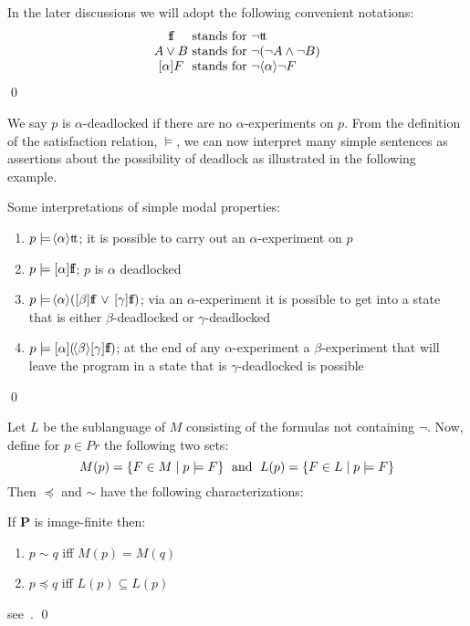 \begin{notation}
In the later discussions we will adopt the following convenient notations:
\[
\begin{array}{c@{\ \hbox{stands for}\ }l}
\dff & \neg \dtt\\
A\vee B & \neg (\neg A\wedge\neg B)\\
\may{\alpha}F & \neg\can{\alpha}\neg F
\end{array}
\]
\qed
\end{notation}

We say $p$ is $\alpha$-deadlocked if there are no $\alpha$-experiments on $p$. From the definition of the satisfaction relation, $\models$, we can now interpret many simple sentences as assertions about the possibility of deadlock as illustrated in the following example.

\begin{example}Some interpretations of simple modal properties:
\begin{enumerate}
\item $p\models \!\left<\alpha\right>\!\hbox{t}\!\hbox{t}$; it is possible to carry out an $\alpha$-experiment on $p$
\item $p\models[\alpha]\hbox{f}\!\hbox{f}$; $p$ is $\alpha$ deadlocked
\item $p\models\!\left<\alpha\right>\!([\beta]\hbox{f}\!\hbox{f}\,\vee\,[\gamma]\hbox{f}\!\hbox{f})$; via an $\alpha$-experiment it is possible to get into a state that is either $\beta$-deadlocked or $\gamma$-deadlocked
\item $p\models[\alpha](\!\left<\beta\right>\![\gamma]\hbox{f}\!\hbox{f})$; at the end of any $\alpha$-experiment a $\beta$-experiment that will leave the program in a state that is $\gamma$-deadlocked is possible
\end{enumerate}
\qed
\end{example}

Let $L$ be the sublanguage of $M$ consisting of the formulas not containing $\neg$. Now, define for $p\in Pr$ the following two sets:
\[
M(p) = \{F\in M\mid p\models F\}\;\hbox{ and }\;L(p)=\{F\in L\mid p\models F\}
\]
Then $\preceq$ and $\sim$ have the following characterizations:
\begin{theorem}\label{theoModalCharacterization}
If {\bf P\/} is image-finite then:
\begin{enumerate}
\item $p\sim q$ iff $M(p) = M(q)$
\item $p\preceq q$ iff $L(p)\subseteq L(p)$
\end{enumerate}
\proof see~\cite{HennessyMilner}.
\qed
\end{theorem}


